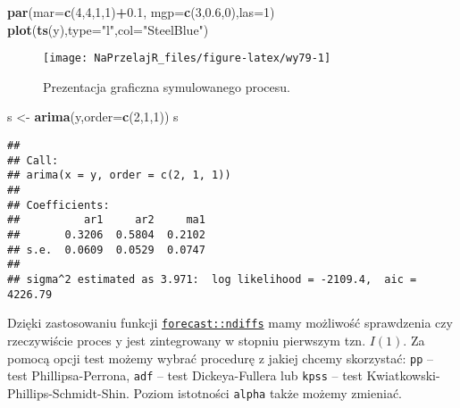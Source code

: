 \documentclass[polish,]{book}
\newenvironment{Shaded}{\begin{snugshade}}{\end{snugshade}}
\newcommand{\DataTypeTok}[1]{\textcolor[rgb]{0.13,0.29,0.53}{#1}}
\newcommand{\DecValTok}[1]{\textcolor[rgb]{0.00,0.00,0.81}{#1}}
\newcommand{\FloatTok}[1]{\textcolor[rgb]{0.00,0.00,0.81}{#1}}
\newcommand{\KeywordTok}[1]{\textcolor[rgb]{0.13,0.29,0.53}{\textbf{#1}}}
\newcommand{\NormalTok}[1]{#1}
\newcommand{\OperatorTok}[1]{\textcolor[rgb]{0.81,0.36,0.00}{\textbf{#1}}}
\newcommand{\StringTok}[1]{\textcolor[rgb]{0.31,0.60,0.02}{#1}}
\begin{document}
\begin{Shaded}
\begin{Highlighting}[]
\KeywordTok{par}\NormalTok{(}\DataTypeTok{mar=}\KeywordTok{c}\NormalTok{(}\DecValTok{4}\NormalTok{,}\DecValTok{4}\NormalTok{,}\DecValTok{1}\NormalTok{,}\DecValTok{1}\NormalTok{)}\OperatorTok{+}\FloatTok{0.1}\NormalTok{, }\DataTypeTok{mgp=}\KeywordTok{c}\NormalTok{(}\DecValTok{3}\NormalTok{,}\FloatTok{0.6}\NormalTok{,}\DecValTok{0}\NormalTok{),}\DataTypeTok{las=}\DecValTok{1}\NormalTok{)}
\KeywordTok{plot}\NormalTok{(}\KeywordTok{ts}\NormalTok{(y),}\DataTypeTok{type=}\StringTok{"l"}\NormalTok{,}\DataTypeTok{col=}\StringTok{"SteelBlue"}\NormalTok{)}
\end{Highlighting}
\end{Shaded}

\begin{figure}[h]

{\centering \texttt{[image: NaPrzelajR\_files/figure-latex/wy79-1]} 

}

\caption{Prezentacja graficzna symulowanego procesu.}\label{fig:wy79}
\end{figure}

\begin{Shaded}
\begin{Highlighting}[]
\NormalTok{s <-}\StringTok{ }\KeywordTok{arima}\NormalTok{(y,}\DataTypeTok{order=}\KeywordTok{c}\NormalTok{(}\DecValTok{2}\NormalTok{,}\DecValTok{1}\NormalTok{,}\DecValTok{1}\NormalTok{))}
\NormalTok{s}
\end{Highlighting}
\end{Shaded}

\begin{verbatim}
## 
## Call:
## arima(x = y, order = c(2, 1, 1))
## 
## Coefficients:
##          ar1     ar2     ma1
##       0.3206  0.5804  0.2102
## s.e.  0.0609  0.0529  0.0747
## 
## sigma^2 estimated as 3.971:  log likelihood = -2109.4,  aic = 4226.79
\end{verbatim}

Dzięki zastosowaniu funkcji \href{https://rdrr.io/cran/forecast/man/ndiffs.html}{\texttt{forecast::ndiffs}} mamy możliwość sprawdzenia czy rzeczywiście proces y jest zintegrowany w stopniu pierwszym tzn. \(I(1)\). Za pomocą opcji test możemy wybrać procedurę z jakiej chcemy skorzystać: \texttt{pp} -- test Phillipsa-Perrona, \texttt{adf} -- test Dickeya-Fullera lub \texttt{kpss} -- test Kwiatkowski-Phillips-Schmidt-Shin. Poziom istotności \texttt{alpha} także możemy zmieniać.
\end{document}
